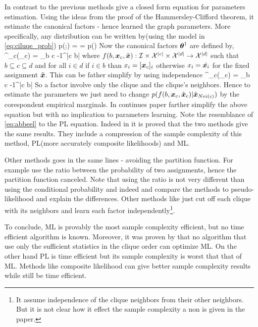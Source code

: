 In contrast to the previous methods   \cite{abbeel2006learning} give a closed form equation for parameters estimation.
Using the ideas from the proof of the Hammersley-Clifford theorem,  it estimate the canonical factors  - hence learned the graph parameters.
More specifically, any distribution can be written by(using the model in \eqref{eq:ciluqe_prob}) 
\be
p(\xx;\exact{\thetav}) =   = p(\tilde{\xx})
\ee
Now the canonical factors $\boldsymbol{\theta}^{\dagger}$ are defined by,
\be
\thetav^{\dagger}_{c}(\xx_c) = \sum_{b \subseteq c} -1^{|c \setminus b|} 
\ee
where  $f(b,\boldsymbol{x}_c,\tilde{\boldsymbol{x}}) : {\cal I} \times {\cal X}^{|c|} \times {\cal X}^{|d|}\to {\cal X}^{|d|}$  such that $b \subseteq c\subseteq d$ and for all $i \in d$ if $i \in b$ than $x_i = [\boldsymbol{x}_c]_i$ otherwise $x_i = \tilde{\boldsymbol{x}_i}$ for the fixed assignment $\tilde{\boldsymbol{x}}$.
This can be father simplify by using independence 
\be
\label{eq:abbeel}
\thetav^{\dagger}_{c}(\xx_c) = \sum_{b \subseteq c} -1^{|c \setminus b|} 
\ee
So a factor involve only the clique and the clique's neighbors.
Hence to estimate the parameters we just need to change $p(f(b,\boldsymbol{x}_c,\tilde{\boldsymbol{x}}_c) |\tilde{\boldsymbol{x}}_{Nei(c)})$ by the corespondent empirical marginals.
In continues  paper \cite{roy2009learning} farther simplify the above equation but with no  implication to parameters learning.
Note the resemblance of  \eqref{eq:abbeel} to the PL equation.
Indeed in \cite{bradley2012sample} it is proved that the two methods give the same results.
They include a compression of the sample complexity of this method, PL(more accurately composite likelihoods)  and ML.

Other methods goes in the same lines - avoiding the partition function. 
For example \cite{hyvarinen2007some} use the ratio between the probability of two assignments, hence the partition function canceled.
Note that using the ratio is not very different than using the conditional probability and indeed \cite{marlin2010inductive} and \cite{marlin2012asymptotic} compare the methods to pseudo-likelihood and explain the differences.
Other methods like \cite{mizrahi2014icml} just cut off each clique with its neighbors and learn each factor independently\footnote{It assume independence of the clique neighbors from their other neighbors. But it is not clear how it effect the sample complexity a non is given in the paper. }.

To conclude, ML is provably the most sample complexity efficient,   but no time efficient algorithm is known.
Moreover, it was proven by \cite{bresler2014hardness,montanari2015computational} that no algorithm that use only the sufficient statistics in the clique order can optimize ML.
On the other hand PL is time efficient but its sample complexity is worst that that of ML.
Methods like composite likelihood can give better sample complexity results while still be time efficient.


